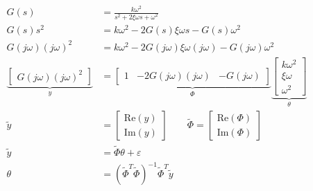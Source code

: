 \begin{align}
	\label{eq:LS1}
	G(s) &= \frac{k\omega^2}{s^2+2\xi\omega s+\omega^2}\\
	\label{eq:LS2}
	G(s)s^2&=k\omega^2-2G(s)\xi\omega s-G(s)\omega^2\\
	\label{eq:LS3}
	G(j\omega)\left(j\omega\right)^2 &= k\omega^2-2G(j\omega)\xi\omega(j\omega) - G(j\omega)\omega^2\\
	\label{eq:LS4}
	\underbrace{\begin{bmatrix}
		G(j\omega)\left(j\omega\right)^2 
	\end{bmatrix}}_y	&=\underbrace{\begin{bmatrix}
		1	&	-2G(j\omega)(j\omega)	&	-G(j\omega)
	\end{bmatrix}}_\Phi	
	\underbrace{\begin{bmatrix}
		k\omega^2\\
		\xi\omega\\
		\omega^2
	\end{bmatrix}}_\theta\\
	\label{eq:LS5}
	\tilde{y} &= \begin{bmatrix}
		\text{Re}\left(y\right)\\
		\text{Im}\left(y\right)
	\end{bmatrix}	\qquad 
		\tilde{\Phi} = 
	\begin{bmatrix}
		\text{Re}\left(\Phi\right)\\
		\text{Im}\left(\Phi\right)
	\end{bmatrix}\\
	\tilde{y} &= \tilde{\Phi}\theta+\varepsilon\\	
	\label{eq:LS6}
	\theta &= \left(\tilde{\Phi}^T\tilde{\Phi}\right)^{-1}\tilde{\Phi}^T\tilde{y}
\end{align}


